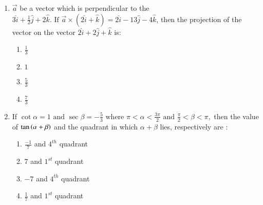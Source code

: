 \documentclass[journal]{IEEEtran}
\theoremstyle{remark}
\begin{document}
\begin{enumerate}[start=11]
\item   
 $\vec{a}$ be a vector which is perpendicular to the  $3\hat{i} + \frac{1}{2}\hat{j} + 2\hat{k}.  \text{ If }  \vec{a} \times (2\hat{i} + \hat{k}) = 2\hat{i} - 13\hat{j} - 4\hat{k}$, then the projection of the vector on the vector
$2\hat{i} + 2\hat{j} + \hat{k} $ is: 

\begin{multicols}{4}
\begin{enumerate}
\item $\frac{1}{3}$
\item $1$
\item $\frac{5}{3}$
\item $\frac{7}{3}$
\end{enumerate}
\end{multicols}

\item  If
$\cot{\alpha} = 1   \text{ and }   \sec{\beta} = -\frac{5}{3} \text{ where }   \pi < \alpha < \frac{3\pi}{2}   \text{ and }   \frac{\pi}{2} < \beta < \pi,$ then the value of $\tan \left(\alpha + \beta\right)$ and the quadrant in which $\alpha + \beta$ lies, respectively are :

\begin{multicols}{2}
\begin{enumerate}
\item $\frac{-1}{7} $ and $4^{th}$ quadrant
\item $7 $ and $1^{st}$ quadrant
\item $-7$ and $4^{th}$ quadrant
\item $\frac{1}{7} $ and $1^{st}$ quadrant
\end{enumerate}
\end{multicols}

\end{enumerate}
\end{document}
